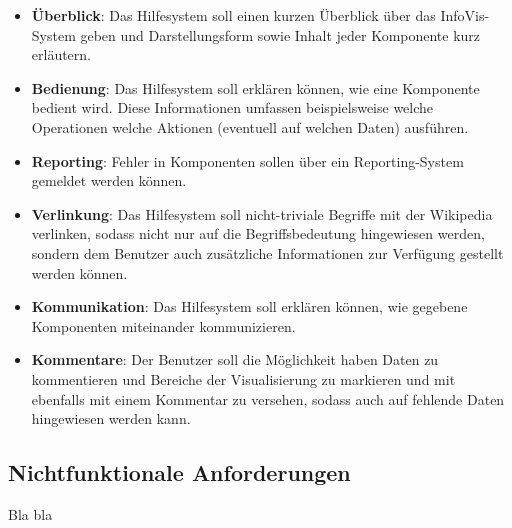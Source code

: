 \documentclass[
	headsepline,
	footsepline,
	fontsize=12pt,
	bibliography=totoc
]{scrbook}
\begin{document}
\begin{itemize}
	\item\textbf{Überblick}: Das Hilfesystem soll einen kurzen Überblick über das InfoVis-System geben und Darstellungsform sowie Inhalt jeder Komponente kurz erläutern.
	\item\textbf{Bedienung}: Das Hilfesystem soll erklären können, wie eine Komponente bedient wird. Diese Informationen umfassen beispielsweise welche Operationen welche Aktionen (eventuell auf welchen Daten) ausführen.
	\item\textbf{Reporting}: Fehler in Komponenten sollen über ein Reporting-System gemeldet werden können.
	\item\textbf{Verlinkung}: Das Hilfesystem soll nicht-triviale Begriffe mit der Wikipedia verlinken, sodass nicht nur auf die Begriffsbedeutung hingewiesen werden, sondern dem Benutzer auch zusätzliche Informationen zur Verfügung gestellt werden können.
	\item\textbf{Kommunikation}: Das Hilfesystem soll erklären können, wie gegebene Komponenten miteinander kommunizieren.
	\item\textbf{Kommentare}: Der Benutzer soll die Möglichkeit haben Daten zu kommentieren und Bereiche der Visualisierung zu markieren und mit ebenfalls mit einem Kommentar zu versehen, sodass auch auf fehlende Daten hingewiesen werden kann.
\end{itemize}

\subsection{Nichtfunktionale Anforderungen}
\label{section:nichtfunktionale_anforderungen}

Bla bla
\end{document}
